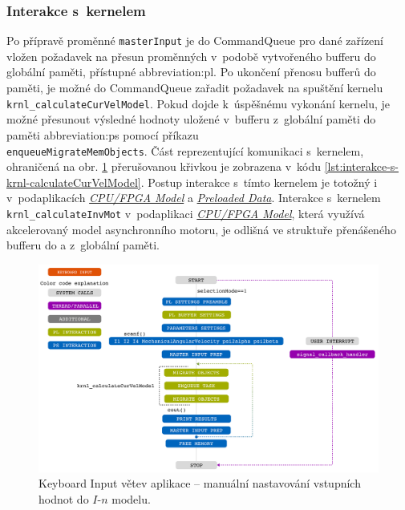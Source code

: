 \documentclass[a4paper, twoside, 11pt]{article}
\begin{document}
			\subsubsection{Interakce s~kernelem}
			Po přípravě proměnné \texttt{masterInput} je do CommandQueue pro dané zařízení vložen požadavek na přesun proměnných v~podobě vytvořeného bufferu do globální paměti, přístupné \gls{abbreviation:pl}. Po ukončení přenosu bufferů do paměti, je možné do CommandQueue zařadit požadavek na spuštění kernelu\\\texttt{krnl\_calculateCurVelModel}. Pokud dojde k~úspěšnému vykonání kernelu, je možné přesunout výsledné hodnoty uložené v~bufferu z~globální paměti do paměti \gls{abbreviation:ps} pomocí příkazu\\\texttt{enqueueMigrateMemObjects}. Část reprezentující komunikaci s~kernelem, ohraničená na obr. \ref{fig:keyboard-input} přerušovanou křivkou je zobrazena v~kódu \ref{lst:interakce-s-krnl-calculateCurVelModel}. Postup interakce s~tímto kernelem je totožný i v~podaplikacích \hyperref[subsec:cpu-fpga]{\textit{CPU/FPGA Model}} a \hyperref[subsec:preloaded-data]{\textit{Preloaded Data}}. Interakce s~kernelem \texttt{krnl\_calculateInvMot} v~podaplikaci \hyperref[subsec:cpu-fpga]{\textit{CPU/FPGA Model}}, která využívá akcelerovaný model asynchronního motoru, je odlišná ve struktuře přenášeného bufferu do a z~globální paměti.\par

 		\begin{figure}[htbp!]
			\centering
			\includegraphics[width=1\textwidth]{src/pdf/keyboard-input.pdf}
			\caption{Keyboard Input větev aplikace – manuální nastavování vstupních hodnot do $I$-$n$ modelu.}
			\label{fig:keyboard-input}
		\end{figure}
\end{document}
